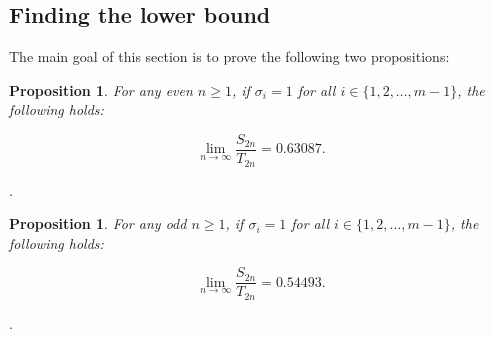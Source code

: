 \documentclass{amsart}
\newtheorem{proposition}[theorem]{Proposition}
\theoremstyle{definition}
\newcommand{\yandi}[1]{\marginpar{\tiny \color{red} Yandi: #1}}
\begin{document}
\subsection{Finding the lower bound}

The main goal of this section is to prove the following two propositions: 

\begin{proposition}\label{prop:lowerboundeven}
For any even $n \geq 1$, if $\sigma_i = 1$ for all $i \in \{1, 2, \dots, m-1\}$, the following holds:

\[\lim_{n\to \infty}\frac{S_{2n}}{T_{2n}} = 0.63087.\]

\end{proposition}.

\begin{proposition}\label{prop:lowerboundodd}
For any odd $n \geq 1$, if $\sigma_i = 1$ for all $i \in \{1, 2, \dots, m-1\}$, the following holds:

\[\lim_{n\to \infty}\frac{S_{2n}}{T_{2n}} = 0.54493.\]

\end{proposition}.
\end{document}
